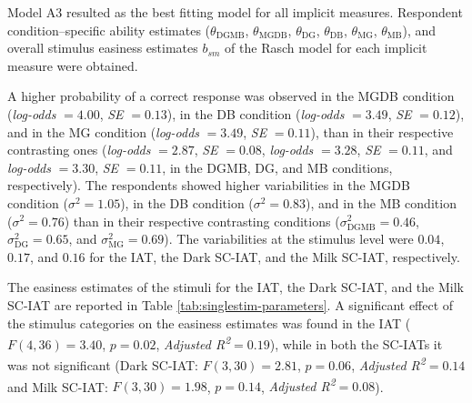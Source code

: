 \documentclass[12pt]{book}
\begin{document}
Model A3 resulted as the best fitting model for all implicit measures. 
Respondent condition--specific ability estimates ($\theta_{\text{DGMB}}$, $\theta_{\text{MGDB}}$, $\theta_{\text{DG}}$, $\theta_{\text{DB}}$, $\theta_{\text{MG}}$, $\theta_{\text{MB}}$), and overall stimulus easiness estimates $b_{sm}$   of the Rasch model for each implicit measure  were obtained.

A higher probability of a correct response was observed in the MGDB condition (\emph{log-odds} $= 4.00$, \emph{SE}  $= 0.13$), in the DB condition (\emph{log-odds} $= 3.49$, \emph{SE}  $= 0.12$), and in the MG condition (\emph{log-odds} $= 3.49$, \emph{SE}  $= 0.11$), than in their respective contrasting ones (\emph{log-odds} $= 2.87$, \emph{SE}  $= 0.08$, \emph{log-odds} $=3.28$, \emph{SE}  $= 0.11$, and \emph{log-odds} $=3.30$, \emph{SE}  $= 0.11$, in the DGMB, DG, and  MB conditions, respectively).
The respondents showed higher variabilities in the MGDB condition ($\sigma^2 = 1.05$), in the  DB condition ($\sigma^2 = 0.83$), and in the MB condition ($\sigma^2 = 0.76$) than in their respective contrasting conditions ($\sigma_{\text{DGMB}}^2 = 0.46$, $\sigma_{\text{DG}}^2 = 0.65$, and $\sigma_{\text{MG}}^2 = 0.69$). 
The variabilities at the stimulus level were $0.04$, $0.17$, and $0.16$ for the IAT, the Dark SC-IAT, and the Milk SC-IAT, respectively.

The easiness estimates of the stimuli for the IAT, the Dark SC-IAT, and the Milk SC-IAT are reported in Table \ref{tab:singlestim-parameters}.
A significant effect of the stimulus categories on the easiness estimates was found in the IAT ($F(4,36)=3.40$, $p = 0.02$, \emph{Adjusted R\textsuperscript{2}}$= 0.19$), while in both the SC-IATs it was not significant (Dark SC-IAT: $F(3,30)=2.81$, $p = 0.06$, \emph{Adjusted R\textsuperscript{2}}$= 0.14$ and Milk SC-IAT: $F(3,30)=1.98$, $p = 0.14$, \emph{Adjusted R\textsuperscript{2}}$= 0.08$).
\end{document}
